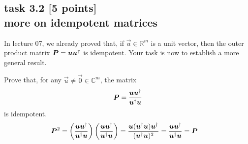 
\subsection*{task 3.2 [5 points] \\[1ex] more on idempotent matrices}

In lecture 07, we already proved that, if $\vec{u} \in \mathbb{R}^m$ is a unit vector, then the outer product matrix $\bm{P} = \bm{u} \bm{u}^\intercal$ is idempotent. Your task is now to establish a more general result.

Prove that, for any $\vec{u} \neq \vec{0} \in \mathbb{C}^m$, the matrix
\begin{equation*}
\bm{P} = \frac{\bm{u} \bm{u}^\dagger}{\bm{u}^\dagger \bm{u}}
\end{equation*}
is idempotent.
\color{blue} \\[1ex]
\begin{align*}
\bm{P}^2
&= \left( \frac{\bm{u} \bm{u}^\dagger}{\bm{u}^\dagger \bm{u}} \right) \left( \frac{\bm{u} \bm{u}^\dagger}{\bm{u}^\dagger \bm{u}} \right) 
= \frac{\bm{u} (\bm{u}^\dagger \bm{u}) \bm{u}^\dagger}{(\bm{u}^\dagger \bm{u})^2}
= \frac{\bm{u} \bm{u}^\dagger}{\bm{u}^\dagger \bm{u}} = \bm{P}
\end{align*}

\color{black}




